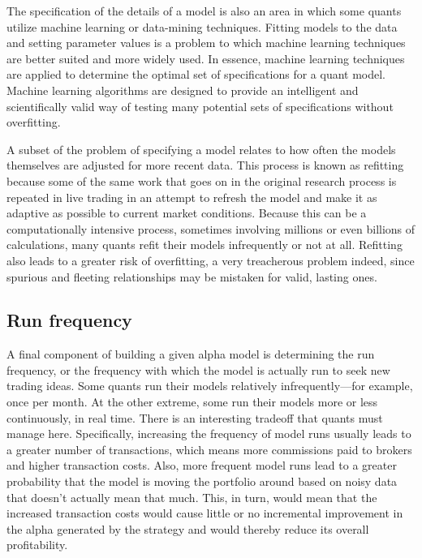 \documentclass[11pt]{report}
\begin{document}
				The specification of the details of a model is also an area in which some quants utilize machine learning or data-mining techniques. Fitting models to the data and setting parameter values is a problem to which machine learning techniques are better suited and more widely used. In essence, machine learning techniques are applied to determine the optimal set of specifications for a quant model. Machine learning algorithms are designed to provide an intelligent and scientifically valid way of testing many potential sets of specifications without overfitting.

				A subset of the problem of specifying a model relates to how often the models themselves are adjusted for more recent data. This process is known as refitting because some of the same work that goes on in the original research process is repeated in live trading in an attempt to refresh the model and make it as adaptive as possible to current market conditions. Because this can be a computationally intensive process, sometimes involving millions or even billions of calculations, many quants refit their models infrequently or not at all. Refitting also leads to a greater risk of overfitting, a very treacherous problem indeed, since spurious and fleeting relationships may be mistaken for valid, lasting ones.

			\subsection{Run frequency}

				A final component of building a given alpha model is determining the run frequency, or the frequency with which the model is actually run to seek new trading ideas. Some quants run their models relatively infrequently—for example, once per month. At the other extreme, some run their models more or less continuously, in real time. There is an interesting tradeoff that quants must manage here. Specifically, increasing the frequency of model runs usually leads to a greater number of transactions, which means more commissions paid to brokers and higher transaction costs. Also, more frequent model runs lead to a greater probability that the model is moving the portfolio around based on noisy data that doesn't actually mean that much. This, in turn, would mean that the increased transaction costs would cause little or no incremental improvement in the alpha generated by the strategy and would thereby reduce its overall profitability.
\end{document}
